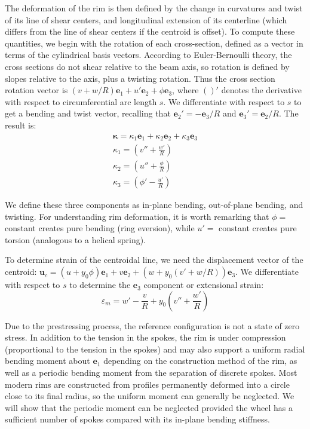 \documentclass[../thesis.tex]{subfiles}
\newcommand{\eo}{\mathbf{e}_1}
\newcommand{\et}{\mathbf{e}_2}
\newcommand{\eh}{\mathbf{e}_3}
\begin{document}
The deformation of the rim is then defined by the change in curvatures and twist of its line of shear centers, and longitudinal extension of its centerline (which differs from the line of shear centers if the centroid is offset). To compute these quantities, we begin with the rotation of each cross-section, defined as a vector in terms of the cylindrical basis vectors. According to Euler-Bernoulli theory, the cross sections do not shear relative to the beam axis, so rotation is defined by slopes relative to the axis, plus a twisting rotation. Thus the cross section rotation vector is $(v + w/R) \mathbf{e}_1 + u' \mathbf{e}_2 + \phi\mathbf{e}_3$, where $()'$ denotes the derivative with respect to circumferential arc length $s$. We differentiate with respect to $s$ to get a bending and twist vector, recalling that $\et' = -\eh/R$ and $\eh' = \et/R$. The result is:
\begin{subequations}
\label{eq:kappa}
\begin{align}
\mathbf{\kappa} = \kappa_1\eo + \kappa_2\et + \kappa_3\eh\\
\kappa_1 = \left( v'' + \frac{w'}{R} \right) \label{eq:kappa1}\\
\kappa_2 = \left( u'' + \frac{\phi}{R} \right) \label{eq:kappa2}\\
\kappa_3 = \left( \phi' - \frac{u'}{R} \right) \label{eq:kappa3}
\end{align}
\end{subequations}

We define these three components as in-plane bending, out-of-plane bending, and twisting. For understanding rim deformation, it is worth remarking that $\phi=$ constant creates pure bending (ring eversion), while $u'=$ constant creates pure torsion (analogous to a helical spring).

To determine strain of the centroidal line, we need the displacement vector of the centroid: $\mathbf{u}_c = (u+y_0\phi)\eo + v\et + (w+y_0 (v'+w/R))\eh$. We differentiate with respect to $s$ to determine the $\eh$ component or extensional strain:
\begin{equation}
\label{eq:mem_strain}
\varepsilon_m = w' - \frac{v}{R} + y_0\left(v'' + \frac{w'}{R} \right)
\end{equation}

Due to the prestressing process, the reference configuration is not a state of zero stress. In addition to the tension in the spokes, the rim is under compression\cite{Sharp} (proportional to the tension in the spokes) and may also support a uniform radial bending moment about $\eo$ depending on the construction method of the rim, as well as a periodic bending moment from the separation of discrete spokes. Most modern rims are constructed from profiles permanently deformed into a circle close to its final radius, so the uniform moment can generally be neglected. We will show that the periodic moment can be neglected provided the wheel has a sufficient number of spokes compared with its in-plane bending stiffness.
\end{document}
